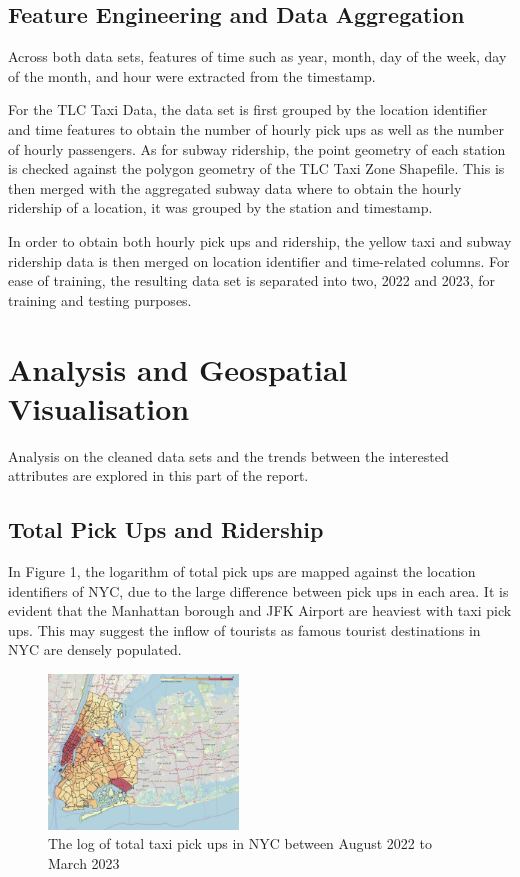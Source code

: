 \documentclass[11pt]{article}
\begin{document}
\subsection{Feature Engineering and Data Aggregation}
Across both data sets, features of time such as year, month, day of the week, day of the month, and hour were extracted from the timestamp. 

For the TLC Taxi Data, the data set is first grouped by the location identifier and time features to obtain the number of hourly pick ups as well as the number of hourly passengers. As for subway ridership, the point geometry of each station is checked against the polygon geometry of the TLC Taxi Zone Shapefile. This is then merged with the aggregated subway data where to obtain the hourly ridership of a location, it was grouped by the station and timestamp.

In order to obtain both hourly pick ups and ridership, the yellow taxi and subway ridership data is then merged on location identifier and time-related columns. For ease of training, the resulting data set is separated into two, 2022 and 2023, for training and testing purposes.

\section{Analysis and Geospatial Visualisation}
Analysis on the cleaned data sets and the trends between the interested attributes are explored in this part of the report. 

\subsection{Total Pick Ups and Ridership}
In Figure 1, the logarithm of total pick ups are mapped against the location identifiers of NYC, due to the large difference between pick ups in each area. It is evident that the Manhattan borough and JFK Airport are heaviest with taxi pick ups. This may suggest the inflow of tourists as famous tourist destinations in NYC are densely populated.

\begin{figure}[ht]
    \centering
    \includegraphics[width=0.45\textwidth]{plots/NYC Total Pickups.jpeg}
    \caption{The log of total taxi pick ups in NYC between August 2022 to March 2023} %
    \centering
\end{figure}
\end{document}
